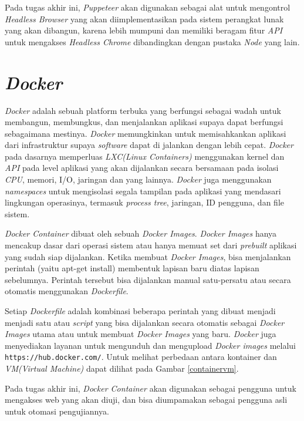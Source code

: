 			\indent Pada tugas akhir ini, \textit{Puppeteer} akan digunakan sebagai alat untuk mengontrol \textit{Headless Browser} yang akan diimplementasikan pada sistem perangkat lunak yang akan dibangun, karena lebih mumpuni dan memiliki beragam fitur \textit{API} untuk mengakses \textit{Headless Chrome} dibandingkan dengan pustaka \textit{Node} yang lain.
		
	\section{\textit{Docker}}
		\textit{Docker} adalah sebuah platform terbuka yang berfungsi sebagai wadah untuk membangun, membungkus, dan menjalankan aplikasi supaya dapat berfungsi sebagaimana mestinya. \textit{Docker} memungkinkan untuk memisahkankan aplikasi dari infrastruktur supaya \textit{software} dapat di jalankan dengan lebih cepat. \textit{Docker} pada dasarnya memperluas \textit{LXC(Linux Containers)} menggunakan kernel dan \textit{API} pada level aplikasi yang akan dijalankan secara bersamaan pada isolasi \textit{CPU}, memori, I/O, jaringan dan yang lainnya. \textit{Docker} juga menggunakan \textit{namespaces} untuk mengisolasi segala tampilan pada aplikasi yang mendasari lingkungan operasinya, termasuk \textit{process tree}, jaringan, ID pengguna, dan file sistem. 
		
		\indent \textit{Docker Container} dibuat oleh sebuah \textit{Docker Images}. \textit{Docker Images} hanya mencakup dasar dari operasi sistem atau hanya memuat set dari \textit{prebuilt} aplikasi yang sudah siap dijalankan. Ketika membuat \textit{Docker Images}, bisa menjalankan perintah (yaitu apt-get install) membentuk lapisan baru diatas lapisan sebelumnya. Perintah tersebut bisa dijalankan manual satu-persatu atau secara otomatis menggunakan \textit{Dockerfile}. 
		
		\indent Setiap \textit{Dockerfile} adalah kombinasi beberapa perintah yang dibuat menjadi menjadi satu atau \textit{script} yang bisa dijalankan secara otomatis sebagai \textit{Docker Images} utama atau untuk membuat \textit{Docker Images} yang baru\cite{docker}\cite{docker_2}. \textit{Docker} juga menyediakan layanan untuk mengunduh dan mengupload \textit{Docker images} melalui \texttt{https://hub.docker.com/}. Untuk melihat perbedaan antara kontainer dan \textit{VM(Virtual Machine)} dapat dilihat pada Gambar \ref{containervm}.
	
		\indent Pada tugas akhir ini, \textit{Docker Container} akan digunakan sebagai pengguna untuk mengakses web yang akan diuji, dan bisa diumpamakan sebagai pengguna asli untuk otomasi pengujiannya. \\
		
